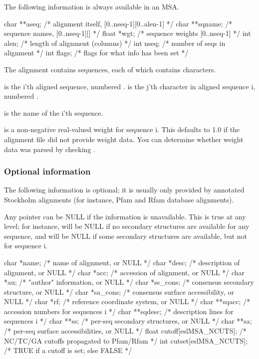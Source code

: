 The following information is always available in an MSA.

\begin{cchunk}
  char **aseq;                  /* alignment itself, [0..nseq-1][0..alen-1] */
  char **sqname;                /* sequence names, [0..nseq-1][]            */
  float *wgt;                   /* sequence weights [0..nseq-1]             */
  int    alen;                  /* length of alignment (columns)            */
  int    nseq;                  /* number of seqs in alignment              */
  int    flags;                 /* flags for what info has been set         */
\end{cchunk}

The alignment contains  sequences, each of which contains
 characters.

 is the i'th aligned sequence, numbered
.  is the j'th character in aligned
sequence i, numbered .

 is the name of the i'th sequence.

 is a non-negative real-valued weight for sequence
i. This defaults to 1.0 if the alignment file did not provide weight
data. You can determine whether weight data was parsed by checking
.

\subsubsection{Optional information}

The following information is optional; it is usually only provided by
annotated Stockholm alignments (for instance, Pfam and Rfam database
alignments). 

Any pointer can be NULL if the information is unavailable. This is
true at any level; for instance,  will be NULL if no
secondary structures are available for any sequence, and 
will be NULL if some secondary structures are available, but not for
sequence i. 

\begin{cchunk}
  char  *name;                  /* name of alignment, or NULL               */
  char  *desc;                  /* description of alignment, or NULL        */
  char  *acc;                   /* accession of alignment, or NULL          */
  char  *au;                    /* "author" information, or NULL            */
  char  *ss_cons;               /* consensus secondary structure, or NULL   */
  char  *sa_cons;               /* consensus surface accessibility, or NULL */
  char  *rf;                    /* reference coordinate system, or NULL     */
  char **sqacc;                 /* accession numbers for sequences i        */
  char **sqdesc;                /* description lines for sequences i        */
  char **ss;                    /* per-seq secondary structures, or NULL    */
  char **sa;                    /* per-seq surface accessibilities, or NULL */
  float  cutoff[eslMSA_NCUTS];  /* NC/TC/GA cutoffs propagated to Pfam/Rfam */
  int    cutset[eslMSA_NCUTS];  /* TRUE if a cutoff is set; else FALSE      */
\end{cchunk}

